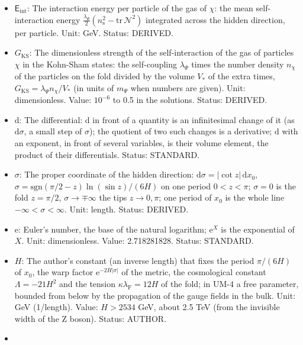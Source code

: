 \documentclass[
  10pt,
]{article}
\providecommand{\tightlist}{%
  \setlength{\itemsep}{0pt}\setlength{\parskip}{0pt}}
\begin{document}
\begin{itemize}
\tightlist
\item
  \(\mathsf{E}_{\mathrm{int}}\): The interaction energy per particle of
  the gas of \(\chi\): the mean self-interaction energy
  \(\frac{\lambda_\Psi}{2}(n_{\mathrm{s}}^2 - \mathrm{tr}\,\mathcal{N}^2)\)
  integrated across the hidden direction, per particle. Unit: GeV.
  Status: DERIVED.
\item
  \(G_{\mathrm{KS}}\): The dimensionless strength of the
  self-interaction of the gas of particles \(\chi\) in the Kohn-Sham
  states: the self-coupling \(\lambda_\Psi\) times the number density
  \(n_\chi\) of the particles on the fold divided by the volume \(V_*\)
  of the extra times, \(G_{\mathrm{KS}} = \lambda_\Psi n_\chi/V_*\) (in
  units of \(m_\Psi\) when numbers are given). Unit: dimensionless.
  Value: \(10^{-6}\) to 0.5 in the solutions. Status: DERIVED.
\item
  \(\mathrm{d}\): The differential: \(\mathrm{d}\) in front of a
  quantity is an infinitesimal change of it (as \(\mathrm{d}\sigma\), a
  small step of \(\sigma\)); the quotient of two such changes is a
  derivative; \(\mathrm{d}\) with an exponent, in front of several
  variables, is their volume element, the product of their
  differentials. Status: STANDARD.
\item
  \(\sigma\): The proper coordinate of the hidden direction:
  \(\mathrm{d}\sigma = \lvert\cot z\rvert\,\mathrm{d}x_0\),
  \(\sigma = \mathrm{sgn}(\pi/2 - z)\ln(\sin z)/(6H)\) on one period
  \(0 < z < \pi\); \(\sigma = 0\) is the fold \(z = \pi/2\),
  \(\sigma \to \mp\infty\) the tips \(z \to 0, \pi\); one period of
  \(x_0\) is the whole line \(-\infty < \sigma < \infty\). Unit: length.
  Status: DERIVED.
\item
  \(\mathrm{e}\): Euler's number, the base of the natural logarithm;
  \(\mathrm{e}^{X}\) is the exponential of \(X\). Unit: dimensionless.
  Value: 2.718281828. Status: STANDARD.
\item
  \(H\): The author's constant (an inverse length) that fixes the period
  \(\pi/(6H)\) of \(x_0\), the warp factor
  \(\mathrm{e}^{-2H\lvert\sigma\rvert}\) of the metric, the cosmological
  constant \(\Lambda = -21H^2\) and the tension
  \(\kappa\lambda_{\mathrm{F}} = 12H\) of the fold; in UM-4 a free
  parameter, bounded from below by the propagation of the gauge fields
  in the bulk. Unit: GeV (1/length). Value: \(H > 2534\) GeV, about 2.5
  TeV (from the invisible width of the Z boson). Status: AUTHOR.
\item

\end{itemize}
\end{document}
